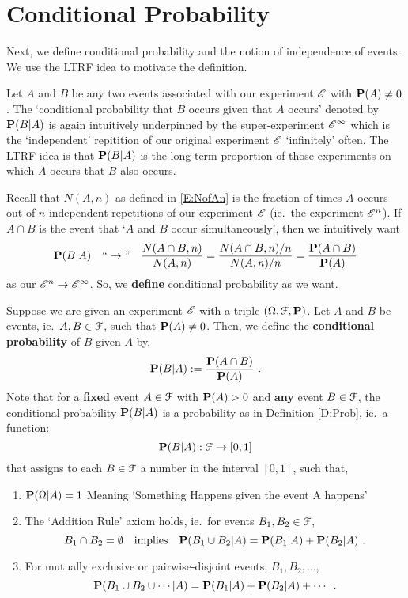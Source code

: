 \section{Conditional Probability}\label{S:CondProb}
Next, we define conditional probability and the notion of independence of events.  We use the LTRF idea to motivate the definition.
\begin{idea}
Let $A$ and $B$ be any two events associated with our experiment $\mathscr{E}$ with $\mathbf{P}(A) \neq 0$.  The `conditional probability that $B$ occurs given that $A$ occurs' denoted by $\mathbf{P}(B|A)$ is again intuitively underpinned by the super-experiment $\mathscr{E}^{\infty}$ which is the `independent' repitition of our original experiment $\mathscr{E}$ `infinitely' often.  The LTRF idea is that $\mathbf{P}(B|A)$ is the long-term proportion of those experiments on which $A$ occurs that $B$ also occurs.
 
Recall that $N(A,n)$ as defined in \eqref{E:NofAn} is the fraction of times $A$ occurs out of $n$ independent repetitions of our experiment $\mathscr{E}$ (ie.~the experiment $\mathscr{E}^{n}$).  If $A \cap B$ is the event that `$A$ and $B$ occur simultaneously', then we intuitively want
\[
\p(B|A) \quad \lq\lq \rightarrow " \quad \frac{N(A \cap B,n)}{N(A,n)} = \frac{N(A \cap B,n)/n}{N(A,n)/n} =  \frac{\p(A \cap B)}{\p(A)}
\]
as our $\mathscr{E}^{n} \rightarrow \mathscr{E}^{\infty}$.  So, we {\bf define} conditional probability as we want.
 \end{idea}
 \begin{definition}\label{D:CondProb}
Suppose we are given an experiment $\mathscr{E}$ with a triple $(\Omega, \mathcal{F}, \mathbf{P})$.  Let $A$ and $B$ be events, ie.~$A,B \in \mathcal{F}$, such that $\mathbf{P}(A) \neq 0$.  Then, we define the {\bf conditional probability} of $B$ given $A$ by,
 \begin{equation}\label{E:CPD}
 \mathbf{P}(B|A) := \frac{\mathbf{P}(A \cap B)}{\mathbf{P}(A)} \ .
 \end{equation}
 Note that for a {\bf fixed} event $A \in \mathcal{F}$ with $\mathbf{P}(A)>0$ and {\bf any} event $B \in \mathcal{F}$, the conditional  probability $\mathbf{P}(B | A)$ is a probability as in \hyperref[D:Prob]{Definition \ref*{D:Prob}}, ie.~a function:
 \[
 \mathbf{P}(B | A) : \mathcal{F} \rightarrow [0,1]
 \]
 that assigns to each $B \in \mathcal{F}$ a number in the interval $[0,1]$, such that,
 \begin{enumerate}
 \item $\mathbf{P}(\Omega | A) = 1$ \qquad Meaning `Something Happens given the event A happens'
 \item The `Addition Rule' axiom holds, ie.~for events $B_1, B_2 \in \mathcal{F}$,
 \[
 B_1 \cap B_2 = \emptyset \quad \text{implies} \quad \p(B_1 \cup B_2 | A) = \p(B_1 | A) + \p(B_2 |  A)  \ .
 \]

\item For mutually exclusive or pairwise-disjoint events, $B_1,B_2, \ldots$,
\[
\mathbf{P}(B_1 \cup B_2 \cup \cdots | A) = \mathbf{P}(B_1|A)+\mathbf{P}(B_2|A)+\cdots \enspace .
\]
\end{enumerate} 
\end{definition}

